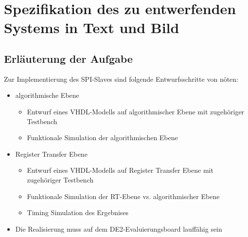 \chapter{Spezifikation des zu entwerfenden Systems in Text und Bild}

\section{Erläuterung der Aufgabe}
Zur Implementierung des SPI-Slaves sind folgende Entwurfsschritte von nöten:
\begin{itemize}
  \item algorithmische Ebene
  \begin{itemize}
    \item Entwurf eines VHDL-Modells auf algorithmischer Ebene mit zugehöriger Testbench
    \item Funktionale Simulation der algorithmischen Ebene
  \end{itemize}
  \item Register Transfer Ebene
  \begin{itemize}
    \item Entwurf eines VHDL-Modells auf Register Transfer Ebene mit zugehöriger Testbench
    \item Funktionale Simulation der RT-Ebene vs. algorithmischer Ebene
    \item Timing Simulation des Ergebnises
  \end{itemize}
  \item Die Realisierung muss auf dem DE2-Evaluierungsboard lauffähig sein
\end{itemize}

